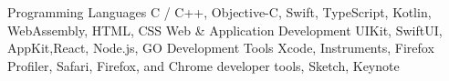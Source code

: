 \begin{cvskills}
  \cvskill
    {Programming Languages}
    {C / C++, Objective-C, Swift, TypeScript, Kotlin, WebAssembly, HTML, CSS}
  \cvskill
    {Web \& Application Development}
    {UIKit, SwiftUI, AppKit,React, Node.js, GO}
  \cvskill
    {Development Tools}
    {Xcode, Instruments, Firefox Profiler, Safari, Firefox, and Chrome developer tools, Sketch, Keynote}
\end{cvskills}
